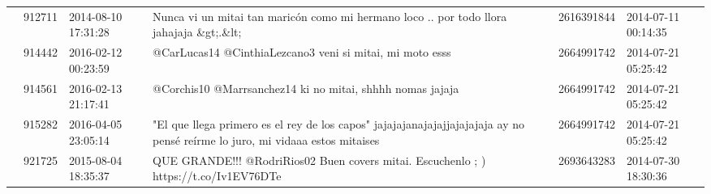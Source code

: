 \begin{tabular}{llllrl}
           & 912711  & 2014-08-10 17:31:28 &                                                    Nunca vi un mitai tan maricón como mi hermano loco ..  por todo llora  jahajaja \&gt;.\&lt; &  2616391844 & 2014-07-11 00:14:35 \\
           & 914442  & 2016-02-12 00:23:59 &                                                                                     @CarLucas14 @CinthiaLezcano3 veni si mitai, mi moto esss &  2664991742 & 2014-07-21 05:25:42 \\
           & 914561  & 2016-02-13 21:17:41 &                                                                                    @Corchis10 @Marrsanchez14 ki no mitai, shhhh nomas jajaja &  2664991742 & 2014-07-21 05:25:42 \\
           & 915282  & 2016-04-05 23:05:14 &                 "El que llega primero es el rey de los capos" jajajajanajajajjajajajaja ay no pensé reírme lo juro, mi vidaaa estos mitaises &  2664991742 & 2014-07-21 05:25:42 \\
           & 921725  & 2015-08-04 18:35:37 &                                                         QUE GRANDE!!! @RodriRios02 Buen covers mitai. Escuchenlo ; ) https://t.co/Iv1EV76DTe &  2693643283 & 2014-07-30 18:30:36 \\
\bottomrule
\end{tabular}

